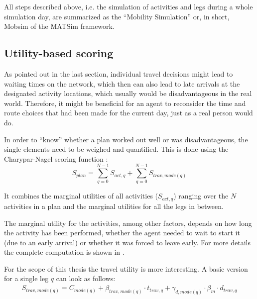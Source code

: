 All steps described above, i.e. the simulation of activities and legs during
a whole simulation day, are summarized as the ``Mobility Simulation'' or, in short, Mobsim
of the MATSim framework.


\subsection{Utility-based scoring}

As pointed out in the last section, individual travel decisions might lead to
waiting times on the network, which then can also lead to late arrivals at the
designated activity locations, which usually would be disadvantageous in the real
world. Therefore, it might be beneficial for an agent to reconsider the time and
route choices that had been made for the current day, just as a real person
would do.

In order to ``know'' whether a plan worked out well or was disadvantageous, the
single elements need to be weighed and quantified. This is done using the Charypar-Nagel
scoring function \citep{Horni2015}:
\begin{equation}
S_{plan} = \sum_{q=0}^{N-1} S_{act,q} + \sum_{q=0}^{N-1} S_{trav,mode(q)}
\end{equation}

It combines the marginal utilities of all activities ($S_{act,q}$) ranging
over the $N$ activities in a plan and the marginal utilities for all the legs in
between.

The marginal utility for the activities, among other factors, depends on how long
the activity has been performed, whether the agent needed to wait to start it (due
to an early arrival) or whether it was forced to leave early. For more details
the complete computation is shown in \citep{Horni2015}.

For the scope of this thesis the travel utility is more interesting. A basic version
for a single leg $q$ can look as follows:
\begin{equation}\begin{aligned}
S_{trav,mode(q)} = C_{mode(q)} + \beta_{trav,mode(q)} \cdot t_{trav,q} + \gamma_{d,mode(q)} \cdot \beta_{m} \cdot d_{trav,q}
\end{aligned}\end{equation}

